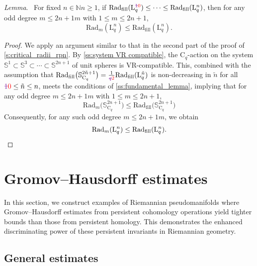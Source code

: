 \documentclass{amsart}
\theoremstyle{definition}
\newcommand{\N}{\mathbb{N}}
\newcommand{\rC}{\mathrm{C}}
\newcommand{\rL}{\mathrm{L}}
\newcommand{\bS}{\mathbb{S}}
\newcommand{\darkblue}{\color{darkblue}}
\newcommand{\VR}{\mathrm{VR}}
\renewcommand{\lemma}{\medskip\noindent\textit{\darkblue Lemma}.\ }
\theoremstyle{theorem}
\newcommand{\fillrad}{\mathrm{Rad}_{\mathrm{fill}}}
\newcommand{\firstdeath}[2]{\mathrm{Rad}_{#1}(#2)}
\providecommand{\DIFaddtex}[1]{{\protect\color{blue}\uwave{#1}}} %
\providecommand{\DIFdeltex}[1]{{\protect\color{red}\sout{#1}}}                      %
\providecommand{\DIFaddbegin}{} %
\providecommand{\DIFaddend}{} %
\providecommand{\DIFdelbegin}{} %
\providecommand{\DIFdelend}{} %
\providecommand{\DIFadd}[1]{\texorpdfstring{\DIFaddtex{#1}}{#1}} %
\providecommand{\DIFdel}[1]{\texorpdfstring{\DIFdeltex{#1}}{}} %
\newcommand{\DIFscaledelfig}{0.5}
\newlength{\DIFdelgraphicswidth} %
\newlength{\DIFdelgraphicsheight} %
\newcommand{\DIFaddincludegraphics}[2][]{{\color{blue}\fbox{\DIFOincludegraphics[#1]{#2}}}} %
\newcommand{\DIFdelincludegraphics}[2][]{%
\sbox{\DIFdelgraphicsbox}{\DIFOincludegraphics[#1]{#2}}%
\settoboxwidth{\DIFdelgraphicswidth}{\DIFdelgraphicsbox} %
\settoboxtotalheight{\DIFdelgraphicsheight}{\DIFdelgraphicsbox} %
\scalebox{\DIFscaledelfig}{%
\parbox[b]{\DIFdelgraphicswidth}{\usebox{\DIFdelgraphicsbox}\\[-\baselineskip] \rule{\DIFdelgraphicswidth}{0em}}\llap{\resizebox{\DIFdelgraphicswidth}{\DIFdelgraphicsheight}{%
\setlength{\unitlength}{\DIFdelgraphicswidth}%
\begin{picture}(1,1)%
\thicklines\linethickness{2pt} %
{\color[rgb]{1,0,0}\put(0,0){\framebox(1,1){}}}%
{\color[rgb]{1,0,0}\put(0,0){\line( 1,1){1}}}%
{\color[rgb]{1,0,0}\put(0,1){\line(1,-1){1}}}%
\end{picture}%
}\hspace*{3pt}}} %
} %
\DeclareRobustCommand{\DIFaddbegin}{\DIFOaddbegin \let\includegraphics\DIFaddincludegraphics} %
\DeclareRobustCommand{\DIFaddend}{\DIFOaddend \let\includegraphics\DIFOincludegraphics} %
\DeclareRobustCommand{\DIFdelbegin}{\DIFOdelbegin \let\includegraphics\DIFdelincludegraphics} %
\DeclareRobustCommand{\DIFdelend}{\DIFOaddend \let\includegraphics\DIFOincludegraphics} %
\renewcommand{\DIFadd}[1]{{\color{red}#1}}
\renewcommand{\DIFdel}[1]{{\color{deletedpurple}\ifmmode\oldmath{#1}\else\sout{#1}\fi}}
\newcommand{\oldmath}[1]{{\color{deletedpurple}\mathpalette\horizontalstrike{#1}}}
\newcommand{\horizontalstrike}[2]{\sbox0{$#1#2$}\rlap{\raisebox{.5\ht0}{\rule{\wd0}{.4pt}}}\usebox0}
\newcommand{\newmath}[1]{{\color{red}#1}}
\begin{document}
\lemma
For fixed \DIFdelbegin \DIFdel{$n\in \N$}\DIFdelend \DIFaddbegin \DIFadd{$n \geq 1$}\DIFaddend , if $\fillrad(\rL^{\oldmath{1}\newmath{0}}_q) \leq \dotsb \leq \fillrad(\rL^n_q)$, then for any \DIFaddbegin \DIFadd{odd }\DIFaddend degree \DIFdelbegin \DIFdel{$m\leq 2n+1$}\DIFdelend \DIFaddbegin \DIFadd{$m$ with $1 \leq m \leq 2n+1$}\DIFaddend ,
\[
\firstdeath{m}{\rL^n_q} \leq \fillrad(\rL^n_q).
\]

\begin{proof}
	We apply an argument similar to that in the second part of the proof of \cref{s:critical_radii_rpn}.
	By \cref{ss:system VR compatible}, the $\rC_q$-action on the system $\bS^1 \subset \bS^3 \subset \dotsb \subset \bS^{2n+1}$ of unit spheres is \(\VR\)-compatible.
	This, combined with the assumption that $\fillrad\big(\bS^{2\tilde{n}+1}_{\rC_q}\big) = \tfrac{1}{\oldmath{q}\newmath{2}} \fillrad(\rL^{\tilde{n}}_q)$ is non-decreasing in $\tilde{n}$ for all $\oldmath{1}\newmath{0}\leq \tilde{n} \leq n$, meets the conditions of \cref{ss:fundamental_lemma}, implying that for any \DIFaddbegin \DIFadd{odd }\DIFaddend degree \DIFdelbegin \DIFdel{$m \leq 2n+1$}\DIFdelend \DIFaddbegin \DIFadd{$m$ with $1 \leq m \leq 2n+1$}\DIFaddend ,
	\[
	\mathrm{Rad}_m\big(\bS^{2n+1}_{\rC_q}\big) \leq \fillrad\big(\bS^{2n+1}_{\rC_q}\big)
	\]
	Consequently, for any \DIFaddbegin \DIFadd{such odd }\DIFaddend degree \DIFdelbegin \DIFdel{$m \leq 2n+1$}\DIFdelend \DIFaddbegin \DIFadd{$m$}\DIFaddend , we obtain
	\[
	\firstdeath{m}{\rL^n_q} \leq \fillrad(\rL^n_q). \qedhere
	\]
\end{proof}



	


\section{Gromov--Hausdorff estimates}\label{s:gh_estimates}

In this section, we construct examples of Riemannian pseudomanifolds where Gromov--Hausdorff estimates from persistent cohomology operations yield tighter bounds than those from persistent homology.
This demonstrates the enhanced discriminating power of these persistent invariants in Riemannian geometry.

\subsection{General estimates}\label{ss:genberal_distance_comparison}
\end{document}
